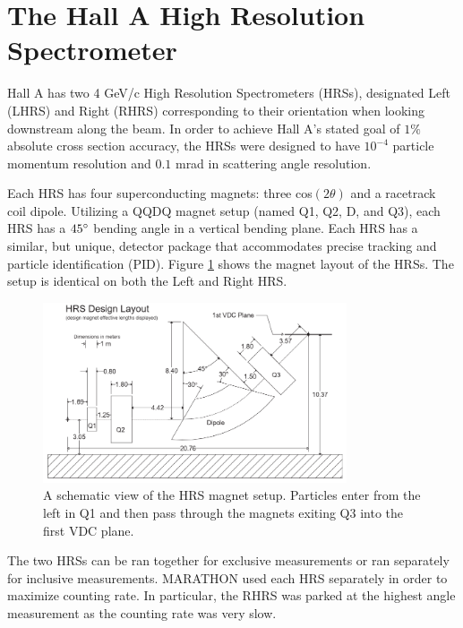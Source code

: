 \section{The Hall A High Resolution Spectrometer}

Hall A has two 4 GeV/c High Resolution Spectrometers (HRSs), designated Left (LHRS) and Right (RHRS) corresponding to their orientation when looking downstream along the beam. In order to achieve Hall A's stated goal of $1\%$ absolute cross section accuracy, the HRSs were designed to have $10^{-4}$ particle momentum resolution and $0.1$ mrad in scattering angle resolution. 

Each HRS has four superconducting magnets: three cos$\left(2\theta\right)$ and a racetrack coil dipole. Utilizing a QQDQ magnet setup (named Q1, Q2, D, and Q3), each HRS has a $45\degree$ bending angle in a vertical bending plane. Each HRS has a similar, but unique, detector package that accommodates precise tracking and particle identification (PID). Figure \ref{fig:hrs_mags} shows the magnet layout of the HRSs. The setup is identical on both the Left and Right HRS.

\begin{figure}
\begin{center}
	\includegraphics[width=0.8\textwidth]{./setup/fig/HRS_mags.png}
	\caption{A schematic view of the HRS magnet setup. Particles enter from the left in Q1 and then pass through the magnets exiting Q3 into the first VDC plane.\cite{HANIM}}
	\label{fig:hrs_mags}
\end{center}
\end{figure}

The two HRSs can be ran together for exclusive measurements or ran separately for inclusive measurements. MARATHON used each HRS separately in order to maximize counting rate. In particular, the RHRS was parked at the highest angle measurement as the counting rate was very slow.

